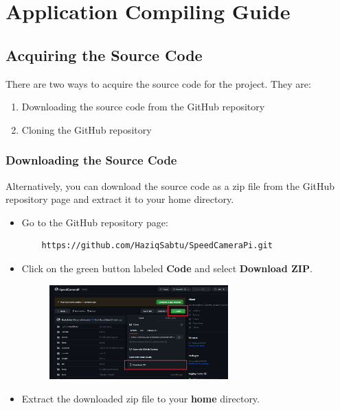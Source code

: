 
\part{Application Compiling Guide}

\chapter{Acquiring the Source Code}
\label{chap:acquiring-the-source-code}

There are two ways to acquire the source code for the project. They are:

\begin{enumerate}
      \item Downloading the source code from the GitHub repository
      \item Cloning the GitHub repository
\end{enumerate}

\section{Downloading the Source Code}
\label{sec:downloading-the-source-code}

Alternatively, you can download the source code as a zip file from the GitHub repository page and extract it to your home directory.

\begin{itemize}
      \item Go to the GitHub repository page:

            \begin{lstlisting}
    https://github.com/HaziqSabtu/SpeedCameraPi.git
    \end{lstlisting}

      \item Click on the green button labeled \textbf{Code} and select \textbf{Download ZIP}.

            \begin{figure}[H]
                  \centering
                  \includegraphics[width=0.65\textwidth]{texs/chapter1/image/dlcode.png}
            \end{figure}

      \item Extract the downloaded zip file to your \textbf{home} directory.
\end{itemize}

